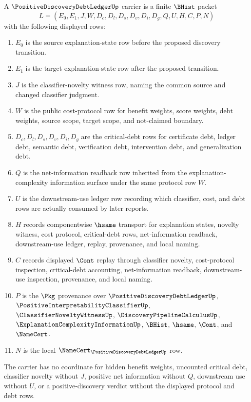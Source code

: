 \begin{definition}
\label{def:positive-discovery-debt-ledger-carrier}
A $\PositiveDiscoveryDebtLedgerUp$ carrier is a finite $\BHist$ packet
$$
L=(E_0,E_1,J,W,D_c,D_l,D_s,D_v,D_i,D_g,Q,U,H,C,P,N)
$$
with the following displayed rows:
\begin{enumerate}
\item $E_0$ is the source explanation-state row before the proposed discovery transition.
\item $E_1$ is the target explanation-state row after the proposed transition.
\item $J$ is the classifier-novelty witness row, naming the common source and changed classifier judgment.
\item $W$ is the public cost-protocol row for benefit weights, score weights, debt weights, source scope, target scope, and not-claimed boundary.
\item $D_c,D_l,D_s,D_v,D_i,D_g$ are the critical-debt rows for certificate debt, ledger debt, semantic debt, verification debt, intervention debt, and generalization debt.
\item $Q$ is the net-information readback row inherited from the explanation-complexity information surface under the same protocol row $W$.
\item $U$ is the downstream-use ledger row recording which classifier, cost, and debt rows are actually consumed by later reports.
\item $H$ records componentwise $\hsame$ transport for explanation states, novelty witness, cost protocol, critical-debt rows, net-information readback, downstream-use ledger, replay, provenance, and local naming.
\item $C$ records displayed $\Cont$ replay through classifier novelty, cost-protocol inspection, critical-debt accounting, net-information readback, downstream-use inspection, provenance, and local naming.
\item $P$ is the $\Pkg$ provenance over $\PositiveDiscoveryDebtLedgerUp$, $\PositiveInterpretabilityClassifierUp$, $\ClassifierNoveltyWitnessUp$, $\DiscoveryPipelineCalculusUp$, $\ExplanationComplexityInformationUp$, $\BHist$, $\hsame$, $\Cont$, and $\NameCert$.
\item $N$ is the local $\NameCert_{\PositiveDiscoveryDebtLedgerUp}$ row.
\end{enumerate}
The carrier has no coordinate for hidden benefit weights, uncounted critical debt, classifier novelty without $J$, positive net information without $Q$, downstream use without $U$, or a positive-discovery verdict without the displayed protocol and debt rows.
\end{definition}

